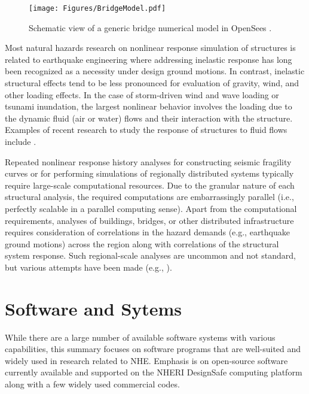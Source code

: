 \begin{figure}[htb]
    \centering
    \texttt{[image: Figures/BridgeModel.pdf]}
    \caption{Schematic view of a generic bridge numerical model in OpenSees \citep{kaviani2012seismic}.}
    \label{fig:response_BridgeModel}
\end{figure}

Most natural hazards research on nonlinear response simulation of structures is related to earthquake engineering where addressing inelastic response has long been recognized as a necessity under design ground motions. In contrast, inelastic structural effects tend to be less pronounced for evaluation of gravity, wind, and other loading effects. In the case of storm-driven wind and wave loading or tsunami inundation, the largest nonlinear behavior involves the loading due to the dynamic fluid (air or water) flows and their interaction with the structure. Examples of recent research to study the response of structures to fluid flows include \cite{minjie2014modeling, minjie2018validation, ataei2015fragility, petrone2017fragility, madurapperuma2013response, attary2016methodology}.

Repeated nonlinear response history analyses for constructing seismic fragility curves or for performing simulations of regionally distributed systems typically require large-scale computational resources. Due to the granular nature of each structural analysis, the required computations are embarrassingly parallel (i.e., perfectly scalable in a parallel computing sense). Apart from the computational requirements, analyses of buildings, bridges, or other distributed infrastructure requires consideration of correlations in the hazard demands (e.g., earthquake ground motions) across the region along with correlations of the structural system response. Such regional-scale analyses are uncommon and not standard, but various attempts have been made (e.g., \cite{miller2015estimating}).

\section{Software and Sytems}
\label{sec:resp_struct_tools}

While there are a large number of available software systems with various capabilities, this summary focuses on software programs that are well-suited and widely used in research related to NHE. Emphasis is on open-source software currently available and supported on the NHERI DesignSafe computing platform along with a few widely used commercial codes.

